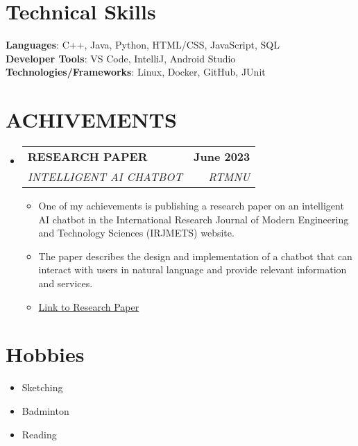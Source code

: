 \documentclass[letterpaper,11pt]{article}
\makeatletter
\newcommand{\resumeItem}[1]{
  \item\small{
    {#1 \vspace{-2pt}}
  }
}
\newcommand{\resumeSubheading}[4]{
  \vspace{-2pt}\item
    \begin{tabular*}{1.0\textwidth}[t]{l@{\extracolsep{\fill}}r}
      \textbf{#1} & \textbf{\small #2} \\
      \textit{\small#3} & \textit{\small #4} \\
    \end{tabular*}\vspace{-7pt}
}
\newcommand{\resumeSubHeadingListStart}{\begin{itemize}[leftmargin=0.0in, label={}]}
\newcommand{\resumeSubHeadingListEnd}{\end{itemize}}
\newcommand{\resumeItemListStart}{\begin{itemize}}
\newcommand{\resumeItemListEnd}{\end{itemize}\vspace{-5pt}}
\makeatother
\begin{document}
\section{Technical Skills}
 \begin{itemize}[leftmargin=0.15in, label={}]
    \small{\item{
     \textbf{Languages}{: C++, Java, Python, HTML/CSS, JavaScript, SQL} \\
     \textbf{Developer Tools}{: VS Code, IntelliJ, Android Studio} \\
     \textbf{Technologies/Frameworks}{: Linux, Docker, GitHub, JUnit} \\
    }}
 \end{itemize}
 \vspace{-16pt}
\section{ACHIVEMENTS}

    \resumeSubHeadingListStart
    \resumeSubheading{RESEARCH PAPER}{June 2023}{INTELLIGENT AI CHATBOT}{RTMNU}
        \resumeItemListStart
            \resumeItem{One of my achievements is publishing a research paper on an intelligent AI chatbot in the International Research Journal of Modern Engineering and Technology Sciences (IRJMETS) website. }
            \resumeItem{The paper describes the design and implementation of a chatbot that can interact with users in natural language and provide relevant information and services.}
            \resumeItem{\href{https://www.irjmets.com/uploadedfiles/paper/issue_6_june_2023/41275/final/fin_irjmets1685775338.pdf}{Link to Research Paper}} %
        \resumeItemListEnd
    \resumeSubHeadingListEnd

\section{Hobbies}
  \resumeItemListStart
    \resumeItem{Sketching}
    \resumeItem{Badminton}
    \resumeItem{Reading}
  \resumeItemListEnd
\end{document}

